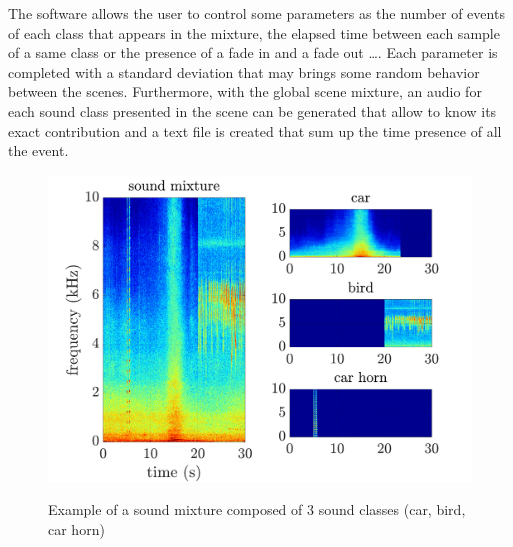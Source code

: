\documentclass[twocolumn,a4paper,10pt]{article}
\begin{document}
The software allows the user to control some parameters as the number of events of each class that appears in the mixture, the elapsed time between each sample of a same class or the presence of a fade in and a fade out \dots. Each parameter is completed with a standard deviation that may brings some random behavior between the scenes. Furthermore, with the global scene mixture, an audio for each sound class presented in the scene can be generated that allow to know its exact contribution and a text file is created that sum up the time presence of all the event.\\

\begin{figure}[h]
\centering
\includegraphics[width=\linewidth]{../image/exampleSimScene.pdf} 
\label{fig:exampleSimScene}
\caption{Example of a sound mixture composed of 3 sound classes (car, bird, car horn)}
\end{figure}
\end{document}
